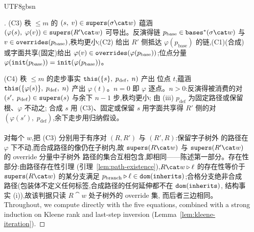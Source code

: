 \begin{CJK*}{UTF8}{gbsn}
\begin{proof}[]
  (C3) 秩 $\le m$ 的 $(s,\; v) \in \supers(\sigma \cat w)$ 蕴涵
  $(\varphi(s),\; \varphi(v)) \in \supers(R' \cat w)$ 可导出。反演得链
  $p_{\mathrm{base}} \in \bases^*(\sigma \cat w)$ 与
  $v \in \mathtt{overrides}(p_{\mathrm{base}})$,秩均更小;(C2) 给出 $R'$ 侧抵达
  $\varphi(p_{\mathrm{base}})$ 的链,(C1)(合成)或字面共享(固定)给出
  $\varphi(v) \in \mathtt{overrides}(\varphi(p_{\mathrm{base}}))$;位点分量
  $\varphi(\mathtt{init}(p_{\mathrm{base}})) = \mathtt{init}(\varphi(p_{\mathrm{base}}))$。

  (C4) 秩 $\le m$ 的走步事实 $\mathtt{this}(\{s\},\; p_{\mathrm{def}},\; n)$ 产出
  位点 $t$,蕴涵 $\mathtt{this}(\{\varphi(s)\},\; p_{\mathrm{def}},\; n)$ 产出
  $\varphi(t)$。$n = 0$ 即 $\varphi$ 逐点。$n > 0$:反演得被消费的对
  $(s',\; p_{\mathrm{def}}) \in \mathtt{supers}(s)$ 与余下 $n - 1$ 步,秩均更小;
  由 (iii) $p_{\mathrm{def}}$ 为固定路径或保留根、$\varphi$ 不动之;
  合成 $s$ 用 (C3)、固定或保留 $s$ 用字面共享得 $R'$ 侧的对
  $(\varphi(s'),\; p_{\mathrm{def}})$,余下走步用归纳假设。

  \paragraph{}
  对每个 $w$,把 (C3) 分别用于有序对 $(R, R')$ 与 $(R', R)$:保留字子树外
  的路径在 $\varphi$ 下不动,而合成路径的像仍在子树内,故
  $\supers(R \cat w)$ 与 $\supers(R' \cat w)$ 的 override 分量中子树外
  路径的集合互相包含,即相同——陈述第一部分。存在性部分:由路径存在性引理
  (引理~\ref{lem:path-existence}),$R \cat w \snoc \ell$ 的存在性等价于
  $\supers(R \cat w)$ 的某分支满足
  $p_{\mathrm{branch}} \mathbin{\triangleright} \ell \in \mathtt{dom}(\mathtt{inherits})$;合格分支绝非合成
  路径(包装体不定义任何标签,合成路径的任何延伸都不在 $\mathtt{dom}(\mathtt{inherits})$,
  结构事实 (i)),故该判据只读 $R \cat w$ 处子树外的 override 集,
  而后者三边相同。
\else
  Throughout, we compute directly with the five equations, combined
  with a strong induction on Kleene rank and last-step inversion
  (Lemma~\ref{lem:kleene-iteration}).


\end{proof}
\end{CJK*}
